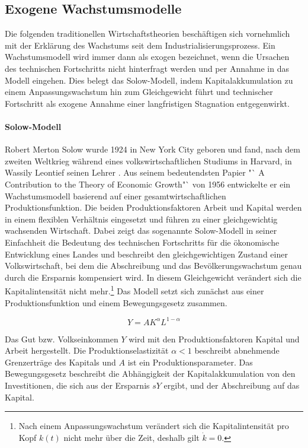 \subsection{Exogene Wachstumsmodelle}
Die folgenden traditionellen Wirtschaftstheorien beschäftigen sich vornehmlich mit der Erklärung des Wachstums seit dem Industrialisierungsprozess. Ein Wachstumsmodell wird immer dann als exogen bezeichnet, wenn die Ursachen des technischen Fortschritts nicht hinterfragt werden und per Annahme in das Modell eingehen. Dies belegt das Solow-Modell, indem Kapitalakkumulation zu einem Anpassungswachstum hin zum Gleichgewicht führt und technischer Fortschritt als exogene Annahme einer langfristigen Stagnation entgegenwirkt.


\paragraph{Solow-Modell}
Robert Merton Solow wurde 1924 in New York City geboren und fand, nach dem zweiten Weltkrieg w{\"a}hrend eines volkswirtschaftlichen Studiums in Harvard, in Wassily Leontief seinen Lehrer \citep{Lin.2007}. Aus seinem bedeutendsten Papier "` A Contribution to the Theory of Economic Growth"` von 1956 entwickelte er ein Wachstumsmodell basierend auf einer gesamtwirtschaftlichen Produktionsfunktion. Die beiden Produktionsfaktoren Arbeit und Kapital werden in einem flexiblen Verh{\"a}ltnis eingesetzt und f{\"u}hren zu einer gleichgewichtig wachsenden Wirtschaft. Dabei zeigt das sogenannte Solow-Modell in seiner Einfachheit die Bedeutung des technischen Fortschritts f{\"u}r die {\"o}konomische Entwicklung eines Landes und beschreibt den gleichgewichtigen Zustand einer Volkswirtschaft, bei dem die Abschreibung und das Bevölkerungswachstum genau durch die Ersparnis kompensiert wird. In diesem Gleichgewicht verändert sich die Kapitalintensit{\"a}t nicht mehr.\footnote{Nach einem Anpassungswachstum verändert sich die Kapitalintensität pro Kopf $k(t)$ nicht mehr über die Zeit, deshalb gilt $\dot{k}=0$.} Das Modell setzt sich zun{\"a}chst aus einer Produktionsfunktion und einem Bewegungsgesetz zusammen.

	\begin{equation}
		Y=A K^\alpha L^{1-\alpha}
	\end{equation}

Das Gut bzw. Volkseinkommen $Y$ wird mit den Produktionsfaktoren Kapital und Arbeit hergestellt. Die Produktionselastizit{\"a}t $\alpha <1$ beschreibt abnehmende Grenzertr{\"a}ge des Kapitals und $A$ ist ein Produktionsparameter. \newline Das Bewegungsgesetz beschreibt die Abh{\"a}ngigkeit der Kapitalakkumulation von den Investitionen, die sich aus der Ersparnis $sY$ ergibt, und der Abschreibung auf das Kapital.

